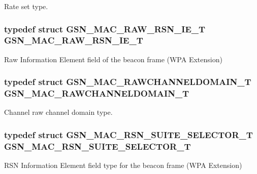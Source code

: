 Rate set type. 

\hypertarget{a00642_ga4a6cc0e7737d1ea40ea41dc94472455f}{
\subsubsection[{GSN\_\-MAC\_\-RAW\_\-RSN\_\-IE\_\-T}]{\setlength{\rightskip}{0pt plus 5cm}typedef struct {\bf GSN\_\-MAC\_\-RAW\_\-RSN\_\-IE\_\-T}  {\bf GSN\_\-MAC\_\-RAW\_\-RSN\_\-IE\_\-T}}}
\label{a00642_ga4a6cc0e7737d1ea40ea41dc94472455f}


Raw Information Element field of the beacon frame (WPA Extension) 

\hypertarget{a00642_gab8bb3634782377a5a3fd1c09ad5bedca}{
\subsubsection[{GSN\_\-MAC\_\-RAWCHANNELDOMAIN\_\-T}]{\setlength{\rightskip}{0pt plus 5cm}typedef struct {\bf GSN\_\-MAC\_\-RAWCHANNELDOMAIN\_\-T}  {\bf GSN\_\-MAC\_\-RAWCHANNELDOMAIN\_\-T}}}
\label{a00642_gab8bb3634782377a5a3fd1c09ad5bedca}


Channel raw channel domain type. 

\hypertarget{a00642_ga26429f56abe84cea3365f048adb8870f}{
\subsubsection[{GSN\_\-MAC\_\-RSN\_\-SUITE\_\-SELECTOR\_\-T}]{\setlength{\rightskip}{0pt plus 5cm}typedef struct {\bf GSN\_\-MAC\_\-RSN\_\-SUITE\_\-SELECTOR\_\-T}  {\bf GSN\_\-MAC\_\-RSN\_\-SUITE\_\-SELECTOR\_\-T}}}
\label{a00642_ga26429f56abe84cea3365f048adb8870f}


RSN Information Element field type for the beacon frame (WPA Extension) 


